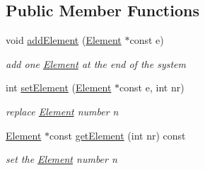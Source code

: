 \subsection*{Public Member Functions}
\begin{DoxyCompactItemize}
\item 
void \hyperlink{classOpticalSystem_a9ea225f3366e3f6794985173be3f42ba}{add\+Element} (\hyperlink{classElement}{Element} $\ast$const e)
\begin{DoxyCompactList}\small\item\em add one \hyperlink{classElement}{Element} at the end of the system \end{DoxyCompactList}\item 
int \hyperlink{classOpticalSystem_a097a1fe0bbddacebab645c5f0dc09361}{set\+Element} (\hyperlink{classElement}{Element} $\ast$const e, int nr)
\begin{DoxyCompactList}\small\item\em replace \hyperlink{classElement}{Element} number n \end{DoxyCompactList}\item 
\hyperlink{classElement}{Element} $\ast$const \hyperlink{classOpticalSystem_a66d8de4ccd5ae4301db88f232f435081}{get\+Element} (int nr) const 
\begin{DoxyCompactList}\small\item\em set the \hyperlink{classElement}{Element} number n \end{DoxyCompactList}\end{DoxyCompactItemize}
